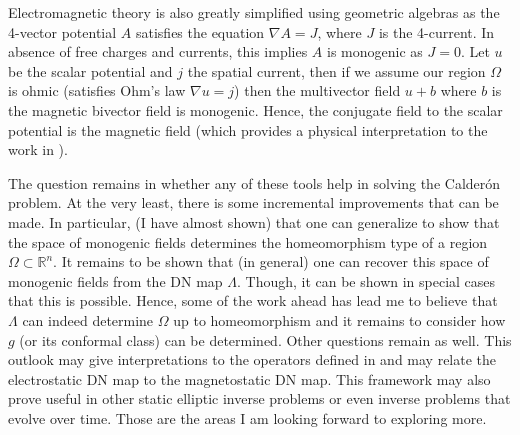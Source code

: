 \documentclass{article}
\newcommand{\R}{\mathbb{R}}
\begin{document}
Electromagnetic theory is also greatly simplified using geometric algebras as the 4-vector potential $A$ satisfies the equation $\nabla A = J$, where $J$ is the 4-current. In absence of free charges and currents, this implies $A$ is monogenic as $J=0$.  Let $u$ be the scalar potential and $j$ the spatial current, then if we assume our region $\Omega$ is ohmic (satisfies Ohm's law $\nabla u = j$) then the multivector field $u+b$ where $b$ is the magnetic bivector field is monogenic. Hence, the conjugate field to the scalar potential is the magnetic field (which provides a physical interpretation to the work in \cite{belishev_dirichlet_2008}).

The question remains in whether any of these tools help in solving the Calder\'on problem. At the very least, there is some incremental improvements that can be made. In particular, (I have almost shown) that one can generalize \cite{belishev_algebras_2019} to show that the space of monogenic fields determines the homeomorphism type of a region $\Omega \subset \R^n$. It remains to be shown that (in general) one can recover this space of monogenic fields from the DN map $\Lambda$. Though, it can be shown in special cases that this is possible. Hence, some of the work ahead has lead me to believe that $\Lambda$ can indeed determine $\Omega$ up to homeomorphism and it remains to consider how $g$ (or its conformal class) can be determined. Other questions remain as well.  This outlook may give interpretations to the operators defined in \cite{sharafutdinov_complete_2013} and may relate the electrostatic DN map to the magnetostatic DN map. This framework may also prove useful in other static elliptic inverse problems or even inverse problems that evolve over time. Those are the areas I am looking forward to exploring more.



\end{document}
